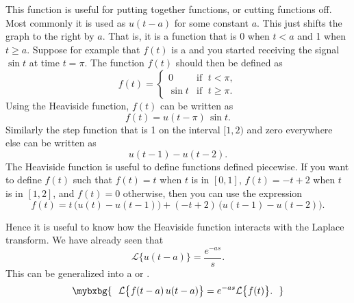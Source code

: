 This function is useful for
putting together functions, or cutting functions off.  Most commonly it is
used as $u(t-a)$ for some constant $a$.  This just shifts the graph to the
right by $a$.  That is, it is a function that is 0 when $t < a$ and 1
when $t \geq a$.  Suppose for example that $f(t)$ is a  and
you started receiving the signal
$\sin t$ at time $t=\pi$.  The function $f(t)$ should then be defined as
\begin{equation*}
f(t) =
\begin{cases}
0 & \text{if } \; t < \pi , \\ 
\sin t & \text{if } \; t \geq \pi .
\end{cases}
\end{equation*}
Using the Heaviside function, $f(t)$ can
be written as
\begin{equation*}
f(t) = u(t - \pi) \, \sin t .
\end{equation*}
Similarly the step function that is 1 on the interval $[1,2)$ and zero
everywhere else can be written as
\begin{equation*}
u(t - 1) - u(t-2) .
\end{equation*}
The Heaviside function is useful to define functions defined piecewise.  If
you want to define $f(t)$ such that $f(t) = t$ when $t$ is in $[0,1]$,
$f(t) = -t+2$
when $t$ is in $[1,2]$, and $f(t) = 0$ otherwise, then you can use the expression
\begin{equation*}
f(t) = t \, \bigl( u(t) - u(t-1) \bigr) + 
(-t+2) \, \bigl( u(t - 1) - u(t-2) \bigr) .
\end{equation*}

Hence it is 
useful to know how the Heaviside function interacts with the Laplace
transform.  We have already seen that
\begin{equation*}
\mathcal{L} \bigl\{ u(t-a) \bigr\} = \frac{e^{-as}}{s} .
\end{equation*}
This can be generalized into a \emph{}
or \emph{}.
\begin{equation} \label{ltd:sseq}
\mybxbg{~~
\mathcal{L} \bigl\{ f(t-a) \, u(t-a) \bigr\}
= e^{-as} \mathcal{L} \bigl\{ f(t) \bigr\} .
~~}
\end{equation}

